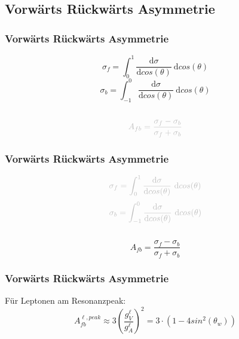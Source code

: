 \subsection{Vorwärts Rückwärts Asymmetrie}
\begin{frame}
	\frametitle{Vorwärts Rückwärts Asymmetrie}
	\begin{center}
		\begin{equation*}
		\sigma_f=\int_{0}^{1}\frac{\text{d}\sigma}{\text{d}cos(\theta)}~\text{d}cos(\theta)
		\end{equation*}
		\begin{equation*}
		\sigma_b=\int_{-1}^{0}\frac{\text{d}\sigma}{\text{d}cos(\theta)}~\text{d}cos(\theta)
		\end{equation*}
		\\
		\begin{equation*}
		\textcolor{lightgray}{A_{fb}=\frac{\sigma_f-\sigma_b}{\sigma_f+\sigma_b}}
		\end{equation*}
	\end{center}
\end{frame}
\begin{frame}
	\frametitle{Vorwärts Rückwärts Asymmetrie}
	\begin{center}
		\begin{equation*}
		\textcolor{lightgray}{\sigma_f=\int_{0}^{1}\frac{\text{d}\sigma}{\text{d}cos(\theta)}~\text{d}cos(\theta)}
		\end{equation*}
		\begin{equation*}
		\textcolor{lightgray}{\sigma_b=\int_{-1}^{0}\frac{\text{d}\sigma}{\text{d}cos(\theta)}~\text{d}cos(\theta)}
		\end{equation*}
		\\
		\begin{equation*}
		A_{fb}=\frac{\sigma_f-\sigma_b}{\sigma_f+\sigma_b}
		\end{equation*}
	\end{center}
\end{frame}
\begin{frame}
	\frametitle{Vorwärts Rückwärts Asymmetrie}
	\begin{center}
		Für Leptonen am Resonanzpeak:
		\begin{equation*}
		A_{fb}^{\ell,peak}\approx 3 \left ( \frac{g^{\ell}_V}{g^{\ell}_A} \right )^2=3\cdot (1-4 sin^2(\theta_w))
		\end{equation*}
	\end{center}
\end{frame}